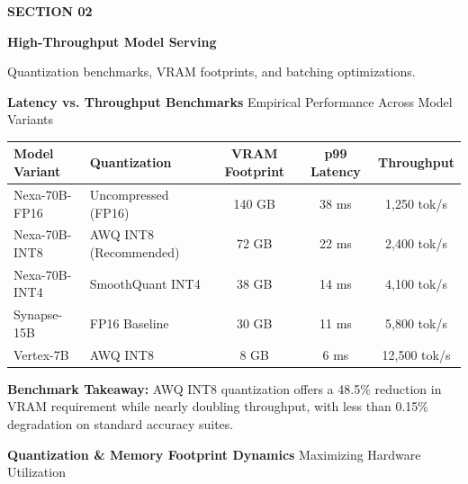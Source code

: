 \documentclass[20pt,landscape,a4paper]{foils}
\newcommand{\SlideHeader}[2]{%
  \begin{tcolorbox}[headerbox]
    {\Huge\bfseries #1} \hfill {\large\textcolor{SlateBorder}{#2}}
  \end{tcolorbox}
  \vspace{6pt}
}
\begin{document}
\vspace*{0.8cm}
\begin{tcolorbox}[enhanced, colback=SlateLight, colframe=NavyPrimary, boxrule=3pt, arc=6pt, boxsep=16pt]
  \textcolor{TealAccent}{\Large \textbf{SECTION 02}} \par\vspace{6pt}
  {\Huge\bfseries High-Throughput Model Serving} \par\vspace{10pt}
  \textcolor{CharcoalText}{\large Quantization benchmarks, VRAM footprints, and batching optimizations.}
\end{tcolorbox}
\pagebreak

\SlideHeader{Latency vs. Throughput Benchmarks}{Empirical Performance Across Model Variants}

\small
\begin{tabularx}{\textwidth}{X l c c c}
  \toprule
  \textbf{Model Variant} & \textbf{Quantization} & \textbf{VRAM Footprint} & \textbf{p99 Latency} & \textbf{Throughput} \\
  \midrule
  Nexa-70B-FP16 & Uncompressed (FP16) & 140 GB & 38 ms & 1,250 tok/s \\
  Nexa-70B-INT8 & AWQ INT8 (Recommended) & 72 GB & 22 ms & 2,400 tok/s \\
  Nexa-70B-INT4 & SmoothQuant INT4 & 38 GB & 14 ms & 4,100 tok/s \\
  Synapse-15B & FP16 Baseline & 30 GB & 11 ms & 5,800 tok/s \\
  Vertex-7B & AWQ INT8 & 8 GB & 6 ms & 12,500 tok/s \\
  \bottomrule
\end{tabularx}

\vspace{6pt}
\begin{tcolorbox}[accentbox]
  \small \textbf{Benchmark Takeaway:} AWQ INT8 quantization offers a 48.5\% reduction in VRAM requirement while nearly doubling throughput, with less than 0.15\% degradation on standard accuracy suites.
\end{tcolorbox}
\pagebreak

\SlideHeader{Quantization \& Memory Footprint Dynamics}{Maximizing Hardware Utilization}
\end{document}

